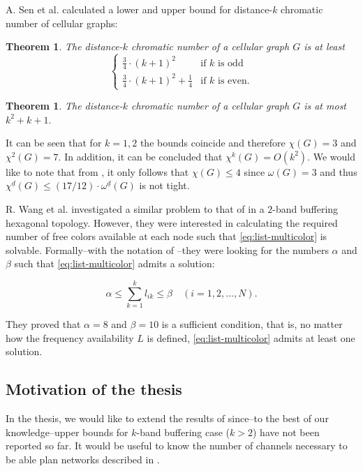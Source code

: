 \documentclass[a4paper, 12pt]{article}
\newtheorem{theo}[lem]{Theorem}
\begin{document}
A. Sen et al. \cite{662943} calculated a lower and upper bound for distance-$k$ chromatic number of cellular graphs:

\begin{theo} The distance-$k$ chromatic number of a cellular graph $G$ is at least
\[ \begin{cases} 
      \frac{3}{4} \cdot (k+1)^2 & \text{if $k$ is odd} \\
      \frac{3}{4} \cdot (k+1)^2 + \frac{1}{4} & \text{if $k$ is even}.
   \end{cases}
\]
\end{theo}

\begin{theo} The distance-$k$ chromatic number of a cellular graph $G$ is at most $k^2 + k + 1.$
\end{theo}

It can be seen that for $k=1,2$ the bounds coincide and therefore $\chi(G)=3$ and $\chi^2(G)=7$. In addition, it can be concluded that $\chi^k(G) = O(k^2).$ We would like to note that from \cite{khanna}, it only follows that $\chi(G) \leqslant 4$ since $\omega(G)=3$ and thus $\chi^{\underline{d}}(G) \leqslant (17/12) \cdot \omega^{\underline{d}}(G)$ is not tight.

R. Wang et al. \cite{7248845} investigated a similar problem to that of \cite{wang-liu} in a $2$-band buffering hexagonal topology. However, they were interested in calculating the required number of free colors available at each node such that \ref{eq:list-multicolor} is solvable. Formally\---with the notation of \cite{wang-liu}\---they were looking for the numbers $\alpha$ and $\beta$ such that \ref{eq:list-multicolor} admits a solution:

$$\alpha \leqslant \sum^k_{k=1} l_{ik} \leqslant \beta \quad (i = 1,2,\ldots,N).$$

They proved that $\alpha=8$ and $\beta=10$ is a sufficient condition, that is, no matter how the frequency availability $L$ is defined, \ref{eq:list-multicolor} admits at least one solution.

\subsection{Motivation of the thesis}
In the thesis, we would like to extend the results of \cite{7248845} since\---to the best of our knowledge\---upper bounds for $k$-band buffering case ($k>2$) have not been reported so far. It would be useful to know the number of channels necessary to be able plan networks described in \cite{wang-liu}.
\end{document}
